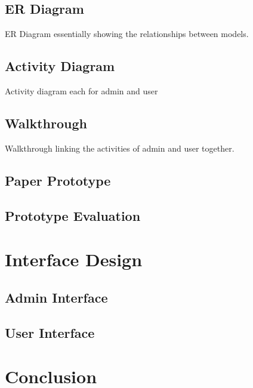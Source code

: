 \documentclass{l3proj}
\begin{document}
	\subsection{ER Diagram}
	ER Diagram essentially showing the relationships between models.
	\subsection{Activity Diagram}
	Activity diagram each for admin and user 
	\subsection{Walkthrough}
	Walkthrough linking the activities of admin and user together.

	\subsection{Paper Prototype}
	\subsection{Prototype Evaluation}

\section{Interface Design}
	\subsection{Admin Interface}
	\subsection{User Interface}


\section{Conclusion}
\end{document}
